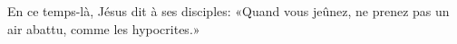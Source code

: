 En ce temps-là, Jésus dit à ses disciples:
	«Quand vous jeûnez, ne prenez pas un air abattu, comme les hypocrites.»
